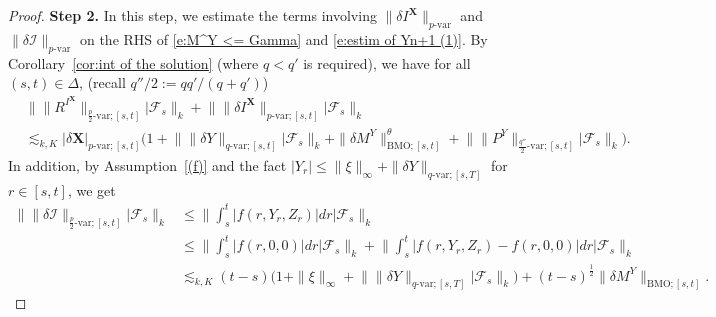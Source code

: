 \documentclass[11pt,reqno]{amsart}
\numberwithin{equation}{section}
\begin{document}
\begin{proof}
{\textbf{Step 2.}} 
In this step, we estimate the terms involving $\|\delta I^{\mathbf X}\|_{p\text{-var}}$ and $\|\delta \mathcal I\|_{p\text{-var}}$ on the RHS of \eqref{e:M^Y <= Gamma} and \eqref{e:estim of Yn+1 (1)}. By Corollary~\ref{cor:int of the solution} (where $q<q'$ is required), we have for all $(s,t)\in\Delta$, (recall $q''/2 := qq'/(q+q')$) 
\begin{equation}\label{e:R^tildeY'}
\begin{aligned}
&\big\| \|R^{I^{\mathbf X}}\|_{\frac{p}{2}\text{-var};[s,t]} \big| \mathcal F_{s} \big\|_{k} + \big\| \|\delta I^{\mathbf X}\|_{p\text{-var};[s,t]} \big| \mathcal F_{s} \big\|_{k}\\
&\lesssim_{k,K}|\delta \mathbf X|_{p\text{-}\mathrm{var};[s,t]} \Big( 1 + \big\| \|\delta Y\|_{q\text{-var};[s,t]} \big| \mathcal F_{s}\big\|_{k} +  \|\delta M^{Y}\|^{\theta}_{\mathrm{BMO};[s,t]} + \big\| \|P^Y\|_{\frac{q''}{2}\text{-}\mathrm{var};[s,t]} \big| \mathcal F_{s} \big\|_{k}\Big).
\end{aligned}
\end{equation}
In addition, by Assumption~\ref{(f)} and the fact $|Y_r| \le \|\xi\|_{\infty} + \|\delta Y\|_{q\text{-}\mathrm{var};[s,T]}$ for $r\in[s,t]$, we get
\begin{align}\nonumber
\big\| \|\delta \mathcal I\|_{\frac{p}{2}\text{-}\mathrm{var};[s,t]} \big| \mathcal F_{s} \big\|_{k} & \le \Big\| \int_{s}^{t} |f(r,Y_r,Z_r)| dr \Big|\mathcal F_{s}\Big\|_{k} \\ \label{e:hat Gamma <= M}
& \le \Big\| \int_{s}^{t} |f(r,0,0)| dr \Big|\mathcal F_{s}\Big\|_{k} + \Big\| \int_{s}^{t} |f(r,Y_r,Z_r) - f(r,0,0)| dr \Big|\mathcal F_{s}\Big\|_{k}\\ \nonumber
&\lesssim_{k,K} (t - s) \Big(1 + \|\xi\|_{\infty} + \big\| \|\delta Y\|_{q\text{-}\mathrm{var};[s,T]} \big| \mathcal F_s \big\|_{k}\Big) + (t - s)^{\frac{1}{2}}\|\delta M^{Y}\|_{\mathrm{BMO};[s,t]}.
\end{align}


\end{proof}
\end{document}
